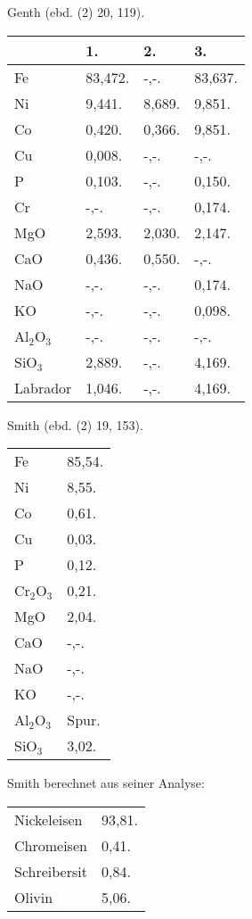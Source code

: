 \documentclass[a4paper, 11pt, oneside]{article}
\begin{document}
Genth (ebd. (2) 20, 119).
\begin{table}[H]
    \centering
    \begin{tabular}{l l l l}
         & 1. & 2. & 3. \\ \hline
        Fe & 83,472. & -,-. & 83,637. \\
        Ni & 9,441. & 8,689. & 9,851. \\
        Co & 0,420. & 0,366. & 9,851. \\
        Cu & 0,008. & -,-. & -,-. \\
        P & 0,103. & -,-. & 0,150. \\
        Cr & -,-. & -,-. & 0,174. \\
        MgO & 2,593. & 2,030. & 2,147. \\
        CaO & 0,436. & 0,550. & -,-. \\
        NaO & -,-. & -,-. & 0,174. \\
        KO & -,-. & -,-. & 0,098. \\
        Al$_{2}$O$_{3}$ & -,-. & -,-. & -,-. \\
        SiO$_{3}$ & 2,889. & -,-. & 4,169. \\
        Labrador & 1,046. & -,-. & 4,169. \\
    \end{tabular}
\end{table}

Smith (ebd. (2) 19, 153).
\begin{table}[H]
    \centering
    \begin{tabular}{l l}
        Fe & 85,54. \\
        Ni & 8,55. \\
        Co & 0,61. \\
        Cu & 0,03. \\
        P & 0,12. \\
        Cr$_{2}$O$_{3}$ & 0,21. \\
        MgO & 2,04. \\
        CaO & -,-. \\
        NaO & -,-. \\
        KO & -,-. \\
        Al$_{2}$O$_{3}$ & Spur. \\
        SiO$_{3}$ & 3,02. \\
    \end{tabular}
\end{table}

Smith berechnet aus seiner Analyse:
\begin{table}[H]
    \centering
    \begin{tabular}{l l}
        Nickeleisen & 93,81. \\
        Chromeisen & 0,41. \\
        Schreibersit & 0,84. \\
        Olivin & 5,06. \\
    \end{tabular}
\end{table}
\end{document}
